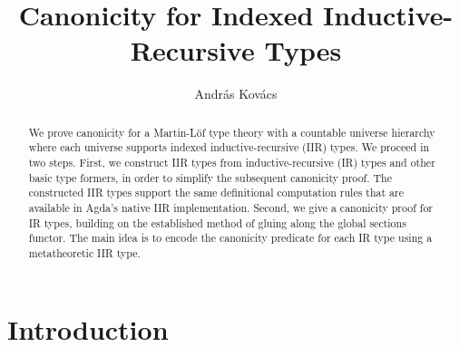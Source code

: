 \documentclass[acmsmall,screen,review,anonymous]{acmart}
\begin{document}
\title{Canonicity for Indexed Inductive-Recursive Types}

\author{András Kovács}


\begin{abstract}
We prove canonicity for a Martin-Löf type theory with a countable universe hierarchy where each
universe supports indexed inductive-recursive (IIR) types. We proceed in two steps. First, we
construct IIR types from inductive-recursive (IR) types and other basic type formers, in order to
simplify the subsequent canonicity proof. The constructed IIR types support the same definitional
computation rules that are available in Agda's native IIR implementation. Second, we give a
canonicity proof for IR types, building on the established method of gluing along the global
sections functor. The main idea is to encode the canonicity predicate for each IR type using a
metatheoretic IIR type.
\end{abstract}


\maketitle

\section{Introduction}\label{sec:introduction}
\end{document}
